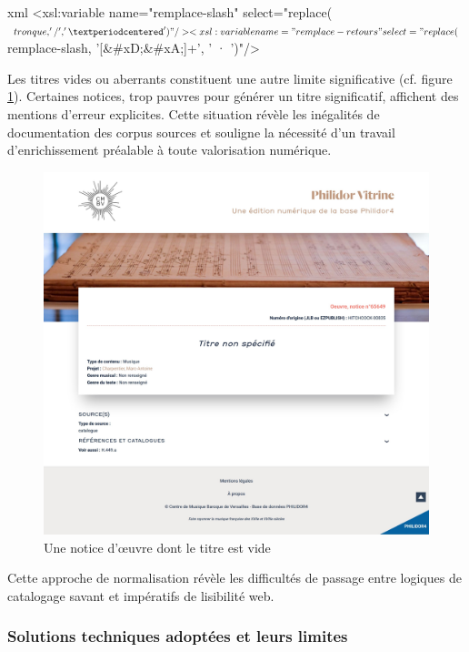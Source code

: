 \begin{codeblock}{xml}
<xsl:variable name="remplace-slash" select="replace($tronque, ' / ', ' · ')"/>
<xsl:variable name="remplace-retours" select="replace($remplace-slash, '[&#xD;&#xA;]+', ' · ')"/>
\end{codeblock}

Les titres vides ou aberrants constituent une autre limite significative (cf. figure \ref{titre-vide-edition}). Certaines notices, trop pauvres pour générer un titre significatif, affichent des mentions d'erreur explicites. Cette situation révèle les inégalités de documentation des corpus sources et souligne la nécessité d'un travail d'enrichissement préalable à toute valorisation numérique.

\begin{figure}[h]
	\caption{Une notice d'œuvre dont le titre est vide} \label{titre-vide-edition}
	\centering
	\includegraphics[width=\textwidth]{images/exemple-notice2-edition-philidor.jpeg}
\end{figure}

Cette approche de normalisation révèle les difficultés de passage entre logiques de catalogage savant et impératifs de lisibilité web.

\subsubsection{Solutions techniques adoptées et leurs limites}

